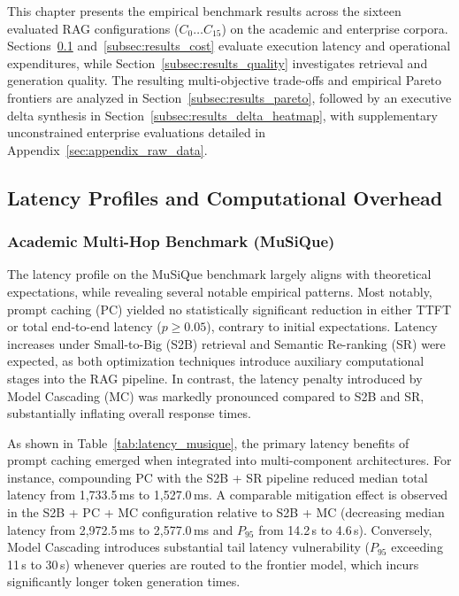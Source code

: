 This chapter presents the empirical benchmark results across the sixteen evaluated RAG configurations ($C_0 \dots C_{15}$) on the academic and enterprise corpora. Sections~\ref{subsec:results_latency} and~\ref{subsec:results_cost} evaluate execution latency and operational expenditures, while Section~\ref{subsec:results_quality} investigates retrieval and generation quality. The resulting multi-objective trade-offs and empirical Pareto frontiers are analyzed in Section~\ref{subsec:results_pareto}, followed by an executive delta synthesis in Section~\ref{subsec:results_delta_heatmap}, with supplementary unconstrained enterprise evaluations detailed in Appendix~\ref{sec:appendix_raw_data}.

\subsection{Latency Profiles and Computational Overhead}
\label{subsec:results_latency}

\subsubsection{Academic Multi-Hop Benchmark (MuSiQue)}
\label{subsubsec:latency_musique}

The latency profile on the MuSiQue benchmark largely aligns with theoretical expectations, while revealing several notable empirical patterns. Most notably, prompt caching (PC) yielded no statistically significant reduction in either TTFT or total end-to-end latency ($p \ge 0.05$), contrary to initial expectations. Latency increases under Small-to-Big (S2B) retrieval and Semantic Re-ranking (SR) were expected, as both optimization techniques introduce auxiliary computational stages into the RAG pipeline. In contrast, the latency penalty introduced by Model Cascading (MC) was markedly pronounced compared to S2B and SR, substantially inflating overall response times.  



As shown in Table~\ref{tab:latency_musique}, the primary latency benefits of prompt caching emerged when integrated into multi-component architectures. For instance, compounding PC with the S2B + SR pipeline reduced median total latency from 1,733.5\,ms to 1,527.0\,ms. A comparable mitigation effect is observed in the S2B + PC + MC configuration relative to S2B + MC (decreasing median latency from 2,972.5\,ms to 2,577.0\,ms and $P_{95}$ from 14.2\,s to 4.6\,s). Conversely, Model Cascading introduces substantial tail latency vulnerability ($P_{95}$ exceeding 11\,s to 30\,s) whenever queries are routed to the frontier model, which incurs significantly longer token generation times.

